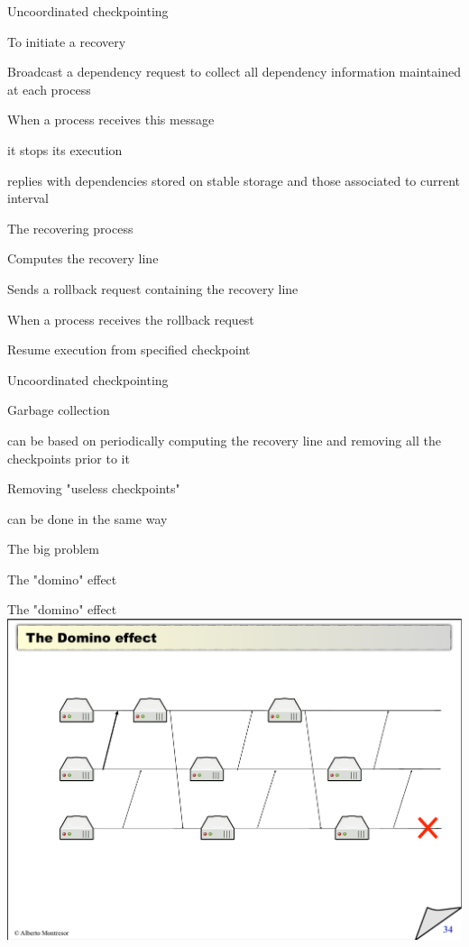 \begin{frame}{Uncoordinated checkpointing}

\BI	
\item To initiate a recovery
	\BI
	\item Broadcast a dependency request to collect all dependency information maintained at each process
	\item When a process receives this message
		\BI 
		\item it stops its execution
		\item replies with dependencies stored on stable storage and those associated to current interval
		\EI
	\EI
\item The recovering process
	\BI
	\item Computes the recovery line
	\item Sends a rollback request containing the recovery line
	\EI
\item When a process receives the rollback request
	\BI
	\item Resume execution from specified checkpoint
	\EI
\EI
\end{frame}

\begin{frame}{Uncoordinated checkpointing}

\BI
\item \alert{Garbage collection}
	\BI
	\item can be based on periodically computing the recovery line and removing all the checkpoints prior to it
	\EI
\item \alert{Removing "useless checkpoints"}
	\BI
	\item can be done in the same way
	\EI
\item \alert{The big problem}
	\BI
	\item The "domino" effect
	\EI
\EI


\end{frame}

\begin{frame}{The "domino" effect}
\includegraphics[width=\textwidth]{domino}
\end{frame}

